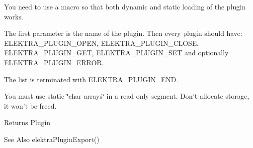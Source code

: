 You need to use a macro so that both dynamic and static loading of the plugin works.

The first parameter is the name of the plugin. Then every plugin should have\-: {\ttfamily E\-L\-E\-K\-T\-R\-A\-\_\-\-P\-L\-U\-G\-I\-N\-\_\-\-O\-P\-E\-N}, {\ttfamily E\-L\-E\-K\-T\-R\-A\-\_\-\-P\-L\-U\-G\-I\-N\-\_\-\-C\-L\-O\-S\-E}, {\ttfamily E\-L\-E\-K\-T\-R\-A\-\_\-\-P\-L\-U\-G\-I\-N\-\_\-\-G\-E\-T}, {\ttfamily E\-L\-E\-K\-T\-R\-A\-\_\-\-P\-L\-U\-G\-I\-N\-\_\-\-S\-E\-T} and optionally {\ttfamily E\-L\-E\-K\-T\-R\-A\-\_\-\-P\-L\-U\-G\-I\-N\-\_\-\-E\-R\-R\-O\-R}.

The list is terminated with {\ttfamily E\-L\-E\-K\-T\-R\-A\-\_\-\-P\-L\-U\-G\-I\-N\-\_\-\-E\-N\-D}.

You must use static \char`\"{}char arrays\char`\"{} in a read only segment. Don't allocate storage, it won't be freed.

\begin{DoxyReturn}{Returns}
Plugin 
\end{DoxyReturn}
\begin{DoxySeeAlso}{See Also}
elektra\-Plugin\-Export() 
\end{DoxySeeAlso}
